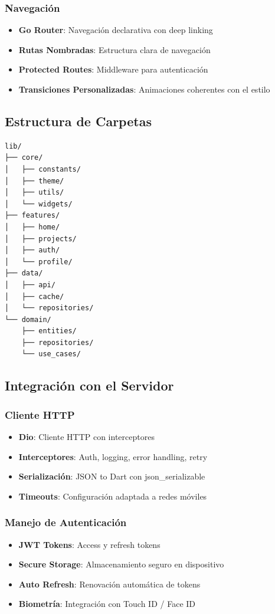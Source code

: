 \documentclass[12pt]{article}
\begin{document}
\subsubsection{Navegación}
\begin{itemize}
    \item \textbf{Go Router}: Navegación declarativa con deep linking
    \item \textbf{Rutas Nombradas}: Estructura clara de navegación
    \item \textbf{Protected Routes}: Middleware para autenticación
    \item \textbf{Transiciones Personalizadas}: Animaciones coherentes con el estilo
\end{itemize}

\subsection{Estructura de Carpetas}
\begin{verbatim}
lib/
├── core/
│   ├── constants/
│   ├── theme/
│   ├── utils/
│   └── widgets/
├── features/
│   ├── home/
│   ├── projects/
│   ├── auth/
│   └── profile/
├── data/
│   ├── api/
│   ├── cache/
│   └── repositories/
└── domain/
    ├── entities/
    ├── repositories/
    └── use_cases/
\end{verbatim}

\subsection{Integración con el Servidor}

\subsubsection{Cliente HTTP}
\begin{itemize}
    \item \textbf{Dio}: Cliente HTTP con interceptores
    \item \textbf{Interceptores}: Auth, logging, error handling, retry
    \item \textbf{Serialización}: JSON to Dart con json\_serializable
    \item \textbf{Timeouts}: Configuración adaptada a redes móviles
\end{itemize}

\subsubsection{Manejo de Autenticación}
\begin{itemize}
    \item \textbf{JWT Tokens}: Access y refresh tokens
    \item \textbf{Secure Storage}: Almacenamiento seguro en dispositivo
    \item \textbf{Auto Refresh}: Renovación automática de tokens
    \item \textbf{Biometría}: Integración con Touch ID / Face ID
\end{itemize}
\end{document}
